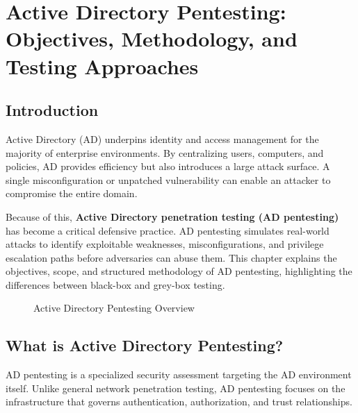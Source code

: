 \chapter{Active Directory Pentesting: Objectives, Methodology, and Testing Approaches}

\label{ch:ad-pentesting}

\section{Introduction}
Active Directory (AD) underpins identity and access management for the majority of enterprise environments. By centralizing users, computers, and policies, AD provides efficiency but also introduces a large attack surface. A single misconfiguration or unpatched vulnerability can enable an attacker to compromise the entire domain.

\warningbox{\lipsum[4]}



Because of this, \textbf{Active Directory penetration testing (AD pentesting)} has become a critical defensive practice. AD pentesting simulates real-world attacks to identify exploitable weaknesses, misconfigurations, and privilege escalation paths before adversaries can abuse them. This chapter explains the objectives, scope, and structured methodology of AD pentesting, highlighting the differences between black-box and grey-box testing.

\begin{figure}[htbp]
  \justifying
  \caption{Active Directory Pentesting Overview}
  \label{fig:ad-pentesting-overview}
\end{figure}

\section{What is Active Directory Pentesting?}
AD pentesting is a specialized security assessment targeting the AD environment itself. Unlike general network penetration testing, AD pentesting focuses on the infrastructure that governs authentication, authorization, and trust relationships.

